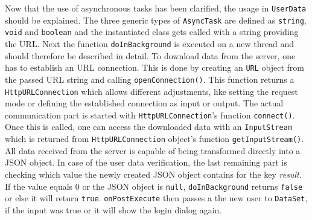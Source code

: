 Now  that the use of asynchronous tasks has been clarified, the usage in \lstinline$UserData$ should be explained. The three generic types of \lstinline$AsyncTask$ are defined as \lstinline$string$, \lstinline$void$ and \lstinline$boolean$ and the instantiated class gets called with a string providing the URL. Next the function \lstinline$doInBackground$ is executed on a new thread and should therefore be described in detail. To download data from the server, one has to establish an URL connection. This is done by creating an \lstinline$URL$ object from the passed URL string and calling \lstinline$openConnection()$. This function returns a \lstinline$HttpURLConnection$ which allows different adjustments, like setting the request mode or defining the established connection as input or output. The actual communication part is started with \lstinline$HttpURLConnection$'s function \lstinline$connect()$. Once this is called, one can access the downloaded data with an \lstinline$InputStream$ which is returned from \lstinline$HttpURLConnection$ object's function \lstinline$getInputStream()$. All data received from the server is capable of being transformed directly into a JSON object. In case of the user data verification, the last remaining part is checking which value the newly created JSON object contains for the key \emph{result}. If the value equals 0 or the JSON object is \lstinline$null$, \lstinline$doInBackground$ returns \lstinline$false$ or else it will return \lstinline$true$. \lstinline$onPostExecute$ then passes a the new user to \lstinline$DataSet$, if the input was true or it will show the login dialog again.

